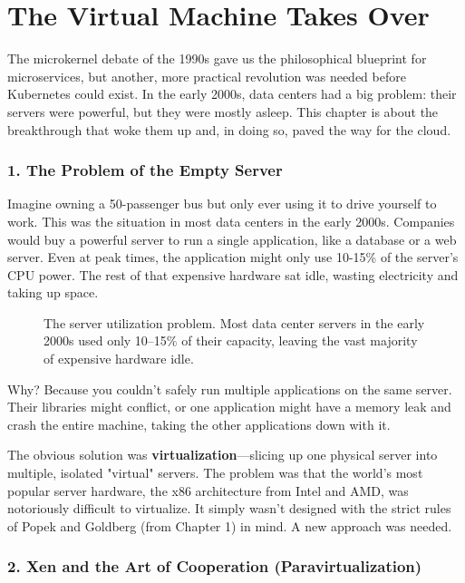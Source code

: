 \chapter{The Virtual Machine Takes Over}


The microkernel debate of the 1990s gave us the philosophical blueprint for microservices, but another, more practical revolution was needed before Kubernetes could exist. In the early 2000s, data centers had a big problem: their servers were powerful, but they were mostly asleep. This chapter is about the breakthrough that woke them up and, in doing so, paved the way for the cloud.


\subsection{1. The Problem of the Empty Server}


Imagine owning a 50-passenger bus but only ever using it to drive yourself to work. This was the situation in most data centers in the early 2000s. Companies would buy a powerful server to run a single application, like a database or a web server. Even at peak times, the application might only use 10-15\% of the server's CPU power. The rest of that expensive hardware sat idle, wasting electricity and taking up space.

\begin{figure}[htbp]
\centering

\caption{The server utilization problem. Most data center servers in the early 2000s used only 10–15\% of their capacity, leaving the vast majority of expensive hardware idle.}
\label{fig:3_1}
\end{figure}


Why? Because you couldn't safely run multiple applications on the same server. Their libraries might conflict, or one application might have a memory leak and crash the entire machine, taking the other applications down with it.

The obvious solution was \textbf{virtualization}---slicing up one physical server into multiple, isolated "virtual" servers. The problem was that the world's most popular server hardware, the x86 architecture from Intel and AMD, was notoriously difficult to virtualize. It simply wasn't designed with the strict rules of Popek and Goldberg (from Chapter 1) in mind. A new approach was needed.


\subsection{2. Xen and the Art of Cooperation (Paravirtualization)}


